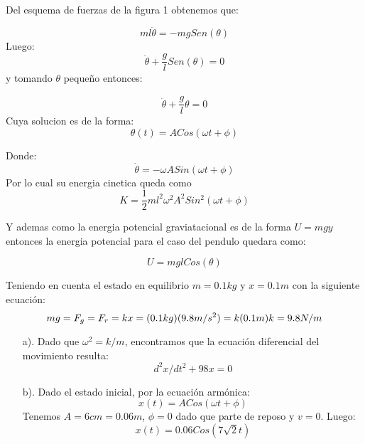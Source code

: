 \documentclass[a4paper]{article}
\begin{document}
    \begin{answer}[Problema 5.]
    
        Del esquema de fuerzas de la figura 1 obtenemos que:
        
        
        \begin{equation*}
            ml\ddot{\theta} = -mgSen(\theta)
        \end{equation*}
        Luego:
\begin{equation*}
     \ddot{\theta} + \frac{g}{l}Sen(\theta) = 0
\end{equation*}
y tomando $\theta$ pequeño  entonces:

    \begin{equation*}
     \ddot{\theta} + \frac{g}{l}\theta = 0
\end{equation*}
Cuya solucion es de la forma:
    \begin{equation*}
        \theta(t) = ACos(\omega t + \phi)
    \end{equation*}
    
    Donde:
    \begin{equation*}
        \dot{\theta} = -\omega ASin(\omega t + \phi)
    \end{equation*}
    Por lo cual su energia cinetica queda como 
    $$K = \frac{1}{2}ml^2\omega^2 A^2 Sin^2(\omega t+\phi )  $$
    
    Y ademas como la energia potencial graviatacional es de la forma $U = mgy$
    entonces la energia potencial para el caso del pendulo quedara como:
    
    \begin{equation*}
        U = mglCos(\theta)
    \end{equation*}
    \end{answer}
    
    \begin{answer}[Problema 6.]
        Teniendo en cuenta el estado en equilibrio $m = 0.1 kg$ y $x = 0.1m$ con la siguiente ecuación:
            \begin{equation}
                mg = F_g = F_r = kx =\\
                (0.1 kg)(9.8 m/s^2) = k (0.1m)\\
                k = 9.8 N/m
            \end{equation}
        \begin{enumerate}
            \item [a).] Dado que $\omega^2 = k/m$, encontramos que la ecuación diferencial del movimiento resulta:
            $$d^2x/dt^2 + 98 x = 0$$
            \item [b).] Dado el estado inicial, por la ecuación armónica:
            $$x(t) = ACos(\omega t + \phi)$$
            Tenemos $A = 6cm = 0.06 m$, $\phi = 0$ dado que parte de reposo y $v = 0$. Luego:
            $$ x(t) = 0.06 Cos(7 \sqrt{2} t)$$
            
        \end{enumerate}
    \end{answer}
    
\end{document}
